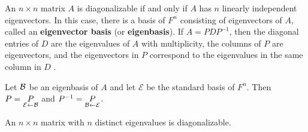 \begin{Thm} An $n\times n$ matrix $A$ is diagonalizable if and only if $A$ has $n$ linearly independent eigenvectors. In this case, there is a basis of $F^n$ consisting of eigenvectors of $A$, called an \textbf{eigenvector basis} (or \textbf{eigenbasis}). If $A = PDP^{-1}$, then the diagonal entries of $D$ are the eigenvalues of $A$ with multiplicity, the columns of $P$ are eigenvectors, and the eigenvectors in $P$ correspond to the eigenvalues in the same column in $D$ .
\end{Thm}
%

Let $\mathcal{B}$ be an eigenbasis of $A$ and let $\mathcal{E}$ be the standard basis of $F^n$. Then $P = \underset{\mathcal{E}\leftarrow \mathcal{B}}{P}$ and $P^{-1} = \underset{\mathcal{B}\leftarrow \mathcal{E}}{P}$.\\

\begin{Thm} An $n\times n$ matrix with $n$ distinct eigenvalues is diagonalizable.
\end{Thm}\vs

